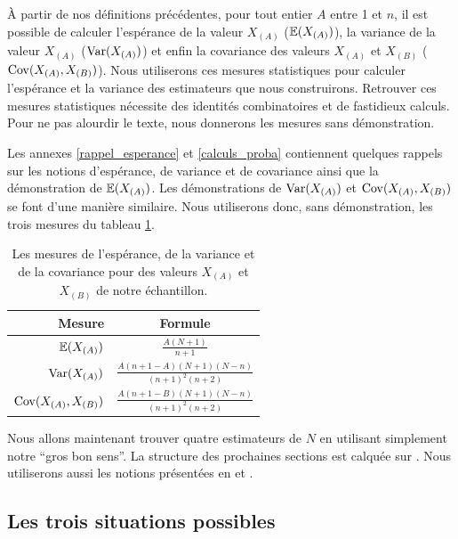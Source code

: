 \documentclass[10pt]{article}
\begin{document}
À partir de nos définitions précédentes, pour tout entier \(A\) entre 1
et \(n\), il est possible de calculer l'espérance de la valeur
\(X_{(A)}\) (\(\operatorname{\mathbb{E}} (X_{(A)})\)), la variance de la valeur \(X_{(A)}\)
(\(\operatorname{Var}(X_{(A)})\)) et enfin la covariance des valeurs \(X_{(A)}\) et
\(X_{(B)}\) (\(\operatorname{Cov}(X_{(A)},X_{(B)})\)). Nous utiliserons ces mesures
statistiques pour calculer l'espérance et la variance des estimateurs
que nous construirons. Retrouver ces mesures statistiques nécessite des
identités combinatoires et de fastidieux calculs. Pour ne pas alourdir
le texte, nous donnerons les mesures sans démonstration.

Les annexes \ref{rappel_esperance} et \ref{calculs_proba} contiennent
quelques rappels sur les notions d'espérance, de variance et de
covariance ainsi que la démonstration de \(\operatorname{\mathbb{E}}(X_{(A)})\). Les
démonstrations de \(\operatorname{Var}(X_{(A)})\) et \(\operatorname{Cov}(X_{(A)},X_{(B)})\) se font
d'une manière similaire. Nous utiliserons donc, sans démonstration, les
trois mesures du tableau \ref{tab:mesures_stat}.

\begin{table}[ht]
\begin{center}
\begin{tabular}{|r|c|}
\hline
Mesure & Formule \\
\hline
\hline
$\operatorname{\mathbb{E}} (X_{(A)})$ & $\frac{A(N+1)}{n+1}$ \\ 
\hline
$\operatorname{Var}(X_{(A)})$ & $\frac{A(n+1-A)(N+1)(N-n)}{(n+1)^2(n+2)}$ \\
\hline
$\operatorname{Cov}(X_{(A)},X_{(B)})$ & $\frac{A(n+1-B)(N+1)(N-n)}{(n+1)^2(n+2)}$ \\
\hline
\end{tabular}
\end{center}
\caption{\label{tab:mesures_stat} {Les mesures de l'espérance, de la variance et de la covariance pour des valeurs $X_{(A)}$ et $X_{(B)}$ de notre échantillon.} }
\end{table}

Nous allons maintenant trouver quatre estimateurs de \(N\) en utilisant
simplement notre ``gros bon sens''. La structure des prochaines sections
est calquée sur \cite{Johnson}. Nous utiliserons aussi les notions
présentées en \cite{Goodman1952} et \cite{Goodman1954}.

\hypertarget{les-trois-situations-possibles}{%
\subsection{Les trois situations
possibles}\label{les-trois-situations-possibles}}
\end{document}
